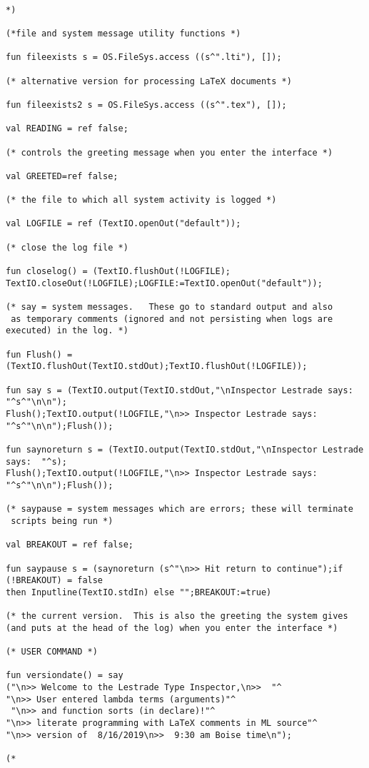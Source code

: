 \documentclass{article}
\begin{document}
\begin{verbatim}

*)

(*file and system message utility functions *)

fun fileexists s = OS.FileSys.access ((s^".lti"), []);

(* alternative version for processing LaTeX documents *)

fun fileexists2 s = OS.FileSys.access ((s^".tex"), []);

val READING = ref false;

(* controls the greeting message when you enter the interface *)

val GREETED=ref false;

(* the file to which all system activity is logged *)

val LOGFILE = ref (TextIO.openOut("default"));

(* close the log file *)

fun closelog() = (TextIO.flushOut(!LOGFILE);
TextIO.closeOut(!LOGFILE);LOGFILE:=TextIO.openOut("default"));

(* say = system messages.   These go to standard output and also
 as temporary comments (ignored and not persisting when logs are 
executed) in the log. *)

fun Flush() = (TextIO.flushOut(TextIO.stdOut);TextIO.flushOut(!LOGFILE));

fun say s = (TextIO.output(TextIO.stdOut,"\nInspector Lestrade says:  "^s^"\n\n");
Flush();TextIO.output(!LOGFILE,"\n>> Inspector Lestrade says:  "^s^"\n\n");Flush());

fun saynoreturn s = (TextIO.output(TextIO.stdOut,"\nInspector Lestrade says:  "^s);
Flush();TextIO.output(!LOGFILE,"\n>> Inspector Lestrade says:  "^s^"\n\n");Flush());

(* saypause = system messages which are errors; these will terminate
 scripts being run *)

val BREAKOUT = ref false;

fun saypause s = (saynoreturn (s^"\n>> Hit return to continue");if (!BREAKOUT) = false 
then Inputline(TextIO.stdIn) else "";BREAKOUT:=true)

(* the current version.  This is also the greeting the system gives 
(and puts at the head of the log) when you enter the interface *)

(* USER COMMAND *)

fun versiondate() = say 
("\n>> Welcome to the Lestrade Type Inspector,\n>>  "^
"\n>> User entered lambda terms (arguments)"^
 "\n>> and function sorts (in declare)!"^
"\n>> literate programming with LaTeX comments in ML source"^
"\n>> version of  8/16/2019\n>>  9:30 am Boise time\n");

(*

\end{verbatim}
\end{document}

